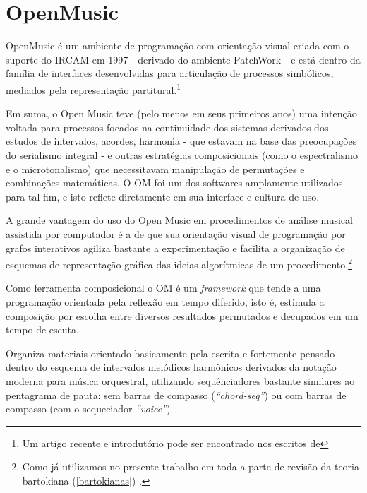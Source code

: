 \documentclass[
	12pt,				%
	openright,			%
	twoside,			%
	a4paper,			%
	english,			%
	french,				%
	spanish,			%
	brazil				%
	]{abntex2}
\begin{document}



\pagebreak
\section{OpenMusic}

OpenMusic é um ambiente de programação com orientação visual criada com o suporte do IRCAM em 1997 -  derivado do ambiente PatchWork - e está dentro da família de interfaces desenvolvidas para articulação de processos simbólicos, mediados pela representação partitural.\footnote{Um artigo recente e introdutório pode ser encontrado nos escritos de }

Em suma, o Open Music teve (pelo menos em seus primeiros anos) uma intenção voltada para processos focados na continuidade dos sistemas derivados dos estudos de intervalos, acordes, harmonia - que estavam na base das preocupações do serialismo integral - e outras estratégias composicionais (como o espectralismo e o microtonalismo) que necessitavam manipulação de permutações e combinações matemáticas. O OM foi um dos softwares amplamente utilizados para tal fim, e isto reflete diretamente em sua interface e cultura de uso.

A grande vantagem do uso do Open Music em procedimentos de análise musical assistida por computador é a de que sua orientação visual de programação por grafos interativos agiliza bastante a experimentação e facilita a organização de esquemas de representação gráfica das ideias algorítmicas de um procedimento.\footnote{Como já utilizamos no presente trabalho em toda a parte de revisão da teoria bartokiana (\autoref{bartokianas})  .} 

Como ferramenta composicional o OM é um \textit{framework} que tende a uma programação orientada pela reflexão em tempo diferido, isto é, estimula a composição por escolha entre diversos resultados permutados e decupados em um tempo de escuta.

Organiza materiais orientado basicamente pela escrita e fortemente pensado dentro do esquema de intervalos melódicos harmônicos derivados da notação moderna para música orquestral, utilizando sequênciadores bastante similares ao pentagrama de pauta: sem barras de compasso (\textit{“chord-seq”}) ou com barras de compasso (com o sequeciador \textit{“voice”}).
\end{document}
